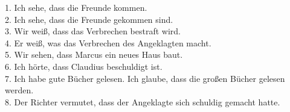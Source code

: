 \documentclass[a4paper]{article}
\begin{document}
1. Ich sehe, dass die Freunde kommen. \\
2. Ich sehe, dass die Freunde gekommen sind. \\
3. Wir weiß, dass das Verbrechen bestraft wird. \\
4. Er weiß, was das Verbrechen des Angeklagten macht. \\
5. Wir sehen, dass Marcus ein neues Haus baut. \\
6. Ich hörte, dass Claudius beschuldigt ist. \\
7. Ich habe gute Bücher gelesen. Ich glaube, dass die großen Bücher gelesen werden. \\
8. Der Richter vermutet, dass der Angeklagte sich schuldig gemacht hatte.
\end{document}
